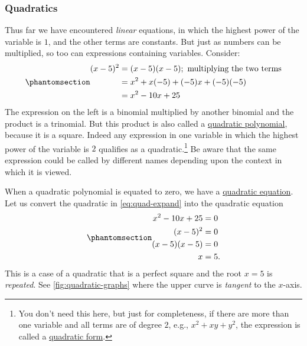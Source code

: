 \documentclass[
  a4paper,
]{article}
\begin{document}
\subsubsection{Quadratics}\label{quadratics}

Thus far we have encountered \emph{linear} equations, in which the
highest power of the variable is \(1\), and the other terms are
constants. But just as numbers can be multiplied, so too can expressions
containing variables. Consider:
\begin{equation}\phantomsection\label{eq:quad-expand}{
\begin{aligned}
(x - 5)^{2} &= (x - 5)(x - 5); \text{ multiplying the two terms}\\
&= x^2 +x(-5) + (-5)x + (-5)(-5)\\
&= x^2 - 10x + 25
\end{aligned}
}\end{equation} The expression on the left is a binomial multiplied by
another binomial and the product is a trinomial. But this product is
also called a \href{https://en.wikipedia.org/wiki/Quadratic}{quadratic
polynomial}, because it is a square. Indeed any expression in one
variable in which the highest power of the variable is \(2\) qualifies
as a quadratic.\footnote{You don't need this here, but just for
  completeness, if there are more than one variable and all terms are of
  degree \(2\), e.g., \(x^2 + xy + y^2\), the expression is called a
  \href{https://en.wikipedia.org/wiki/Quadratic_form}{quadratic form}.}
Be aware that the same expression could be called by different names
depending upon the context in which it is viewed.

When a quadratic polynomial is equated to zero, we have a
\href{https://en.wikipedia.org/wiki/Quadratic_equation}{quadratic
equation}. Let us convert the quadratic in \cref{eq:quad-expand} into
the quadratic equation
\begin{equation}\phantomsection\label{eq:repeated-root}{
\begin{aligned}
x^2 -10x + 25 &= 0\\
(x - 5)^2 &= 0\\
(x - 5)(x - 5) &= 0\\
x &= 5.
\end{aligned}
}\end{equation} This is a case of a quadratic that is a perfect square
and the root \(x = 5\) is \emph{repeated}. See
\cref{fig:quadratic-graphs} where the upper curve is \emph{tangent} to
the \(x\)-axis.
\end{document}
